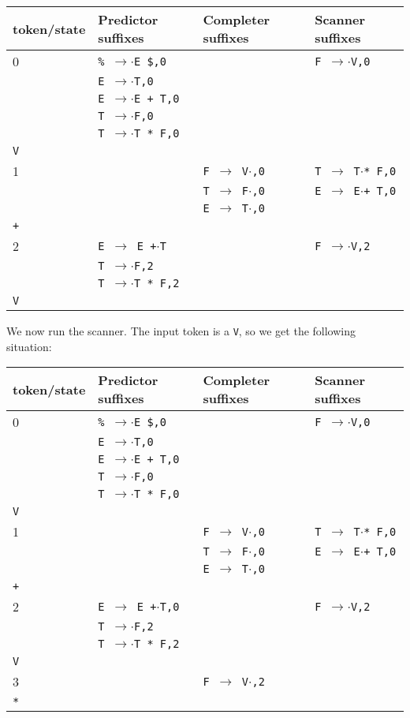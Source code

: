 \documentclass[11pt]{article}
\def\ra{\rightarrow}
\begin{document}
\begin{tabular}{|l|l|l|l|}
\hline
token/state & Predictor suffixes & Completer suffixes & Scanner suffixes\\
\hline
0     & \texttt{\% $\ra$$\cdot$E \$,0} & & \texttt{F $\ra$$\cdot$V,0}\\
      & \texttt{E $\ra$$\cdot$T,0} & & \\
      & \texttt{E $\ra$$\cdot$E + T,0} & & \\
      & \texttt{T $\ra$$\cdot$F,0} & & \\
      & \texttt{T $\ra$$\cdot$T * F,0} & & \\
\hline
\texttt{V} &  & &\\
\hline
1     &  & \texttt{F $\ra$ V$\cdot$,0}& \texttt{T $\ra$ T$\cdot$* F,0} \\
      &  & \texttt{T $\ra$ F$\cdot$,0}& \texttt{E $\ra$ E$\cdot$+ T,0} \\
      &  & \texttt{E $\ra$ T$\cdot$,0}& \\
\hline
\texttt{+} &  & &\\
\hline
2     & \texttt{E $\ra$ E +$\cdot$T} & & \texttt{F $\ra$$\cdot$V,2}\\
      & \texttt{T $\ra$$\cdot$F,2} & & \\
      & \texttt{T $\ra$$\cdot$T * F,2} & & \\
\hline 
\texttt{V} &  & &\\
\hline
\end{tabular}


We now run the scanner.  The input token is a \texttt{V}, so we get
the following situation:

\begin{tabular}{|l|l|l|l|}
\hline
token/state & Predictor suffixes & Completer suffixes & Scanner suffixes\\
\hline
0     & \texttt{\% $\ra$$\cdot$E \$,0} & & \texttt{F $\ra$$\cdot$V,0}\\
      & \texttt{E $\ra$$\cdot$T,0} & & \\
      & \texttt{E $\ra$$\cdot$E + T,0} & & \\
      & \texttt{T $\ra$$\cdot$F,0} & & \\
      & \texttt{T $\ra$$\cdot$T * F,0} & & \\
\hline
\texttt{V} &  & &\\
\hline
1     &  & \texttt{F $\ra$ V$\cdot$,0}& \texttt{T $\ra$ T$\cdot$* F,0} \\
      &  & \texttt{T $\ra$ F$\cdot$,0}& \texttt{E $\ra$ E$\cdot$+ T,0} \\
      &  & \texttt{E $\ra$ T$\cdot$,0}& \\
\hline
\texttt{+} &  & &\\
\hline
2     & \texttt{E $\ra$ E +$\cdot$T,0} & & \texttt{F $\ra$$\cdot$V,2}\\
      & \texttt{T $\ra$$\cdot$F,2} & & \\
      & \texttt{T $\ra$$\cdot$T * F,2} & & \\
\hline 
\texttt{V} & & &\\
\hline
3     &  &  \texttt{F $\ra$ V$\cdot$,2}& \\
\hline
\texttt{*} & & & \\
\hline
\end{tabular}
\end{document}
